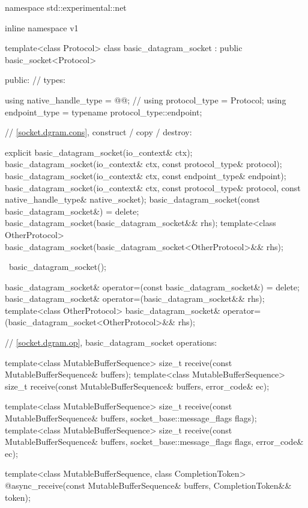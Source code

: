 \begin{codeblock}
namespace std::experimental::net {
inline namespace v1 {

  template<class Protocol>
  class basic_datagram_socket : public basic_socket<Protocol>
  {
  public:
    // types:

    using native_handle_type = @@; // \nativeref
    using protocol_type = Protocol;
    using endpoint_type = typename protocol_type::endpoint;

    // \ref{socket.dgram.cons}, construct / copy / destroy:

    explicit basic_datagram_socket(io_context& ctx);
    basic_datagram_socket(io_context& ctx, const protocol_type& protocol);
    basic_datagram_socket(io_context& ctx, const endpoint_type& endpoint);
    basic_datagram_socket(io_context& ctx, const protocol_type& protocol,
                          const native_handle_type& native_socket);
    basic_datagram_socket(const basic_datagram_socket&) = delete;
    basic_datagram_socket(basic_datagram_socket&& rhs);
    template<class OtherProtocol>
      basic_datagram_socket(basic_datagram_socket<OtherProtocol>&& rhs);

    ~basic_datagram_socket();

    basic_datagram_socket& operator=(const basic_datagram_socket&) = delete;
    basic_datagram_socket& operator=(basic_datagram_socket&& rhs);
    template<class OtherProtocol>
      basic_datagram_socket& operator=(basic_datagram_socket<OtherProtocol>&& rhs);

    // \ref{socket.dgram.op}, basic_datagram_socket operations:

    template<class MutableBufferSequence>
      size_t receive(const MutableBufferSequence& buffers);
    template<class MutableBufferSequence>
      size_t receive(const MutableBufferSequence& buffers,
                     error_code& ec);

    template<class MutableBufferSequence>
      size_t receive(const MutableBufferSequence& buffers,
                     socket_base::message_flags flags);
    template<class MutableBufferSequence>
      size_t receive(const MutableBufferSequence& buffers,
                     socket_base::message_flags flags, error_code& ec);

    template<class MutableBufferSequence, class CompletionToken>
      @\DEDUCED@ async_receive(const MutableBufferSequence& buffers,
                            CompletionToken&& token);

}}}
\end{codeblock}
